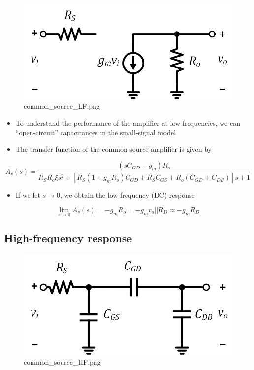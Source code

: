 \documentclass[11pt]{article}
\providecommand{\tightlist}{%
      \setlength{\itemsep}{0pt}\setlength{\parskip}{0pt}}
\begin{document}
    \begin{figure}
\centering
\includegraphics{common_source_LF.png}
\caption{common\_source\_LF.png}
\end{figure}

    \begin{itemize}
\tightlist
\item
  To understand the performance of the amplifier at low frequencies, we
  can ``open-circuit'' capacitances in the small-signal model
\item
  The transfer function of the common-source amplifier is given by
\end{itemize}

\begin{equation}
A_v(s) = \dfrac{(sC_{GD} - g_m)R_o}{R_S R_o\xi s^2 + [R_S(1+g_mR_o)C_{GD} + R_SC_{GS}+R_o(C_{GD} + C_{DB})]s+1}
\end{equation}

\begin{itemize}
\tightlist
\item
  If we let \(s\rightarrow0\), we obtain the low-frequency (DC) response
\end{itemize}

\begin{equation}
\lim_{s\rightarrow 0}{A_v(s)} = -g_m R_o = -g_m r_o || R_D \approx \boxed{-g_m R_D}
\end{equation}

    \hypertarget{high-frequency-response}{%
\subsection{High-frequency response}\label{high-frequency-response}}

    \begin{figure}
\centering
\includegraphics{common_source_HF.png}
\caption{common\_source\_HF.png}
\end{figure}
\end{document}

